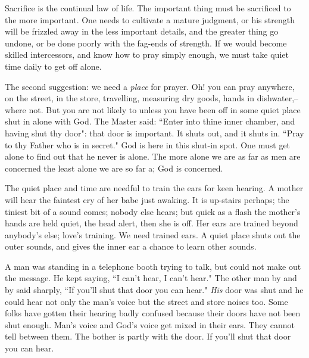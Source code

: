 Sacrifice is the continual law of life. The important thing must be
sacrificed to the more important. One needs to cultivate a mature
judgment, or his strength will be frizzled away in the less important
details, and the greater thing go undone, or be done poorly with the
fag-ends of strength. If we would become skilled intercessors, and know
how to pray simply enough, we must take quiet time daily to get off alone.

The second suggestion: we need a \textit{place} for prayer. Oh! you can pray
anywhere, on the street, in the store, travelling, measuring dry goods,
hands in dishwater,--where not. But you are not likely to unless you have
been off in some quiet place shut in alone with God. The Master said:
``Enter into thine inner chamber, and having shut thy door": that door is
important. It shuts out, and it shuts in. ``Pray to thy Father who is in
secret." God is here in this shut-in spot. One must get alone to find out
that he never is alone. The more alone we are as far as men are concerned
the least alone we are so far a; God is concerned.

The quiet place and time are needful to train the ears for keen hearing. A
mother will hear the faintest cry of her babe just awaking. It is
up-stairs perhaps; the tiniest bit of a sound comes; nobody else hears;
but quick as a flash the mother's hands are held quiet, the head alert,
then she is off. Her ears are trained beyond anybody's else; love's
training. We need trained ears. A quiet place shuts out the outer sounds,
and gives the inner ear a chance to learn other sounds.

A man was standing in a telephone booth trying to talk, but could not make
out the message. He kept saying, ``I can't hear, I can't hear." The other
man by and by said sharply, ``If you'll shut that door you can hear." \textit{His}
door was shut and he could hear not only the man's voice but the street
and store noises too. Some folks have gotten their hearing badly confused
because their doors have not been shut enough. Man's voice and God's voice
get mixed in their ears. They cannot tell between them. The bother is
partly with the door. If you'll shut that door you can hear.

